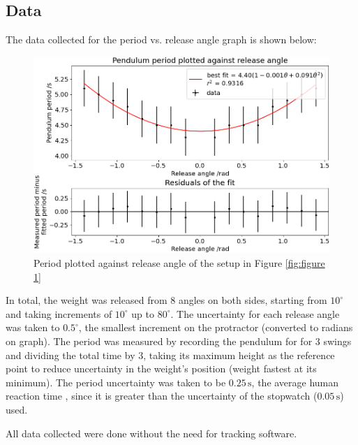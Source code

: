 \documentclass[11pt]{article}
\begin{document}
\begin{multicols}{2}
\subsection{Data} \label{subsec 3.2 Data}
The data collected for the period vs. release angle graph is shown below:

\begin{figure}[H]
    \centering
    \includegraphics[width=\linewidth]{../figures/period_vs_release_angle.png}
    \caption{\centering Period plotted against release angle of the setup in Figure \ref{fig:figure 1}}
    \label{fig:figure 2}
\end{figure}

In total, the weight was released from 8 angles on both sides, starting from $10^\circ$ and taking increments of $10^\circ$ up to $80^\circ$. The uncertainty for each release angle was taken to $0.5^{\circ}$, the smallest increment on the protractor (converted to radians on graph). The period was measured by recording the pendulum for for 3 swings and dividing the total time by 3, taking its maximum height as the reference point to reduce uncertainty in the weight's position (weight fastest at its minimum). The period uncertainty was taken to be $0.25\,\text{s}$, the average human reaction time \cite{reaction-time}, since it is greater than the uncertainty of the stopwatch ($0.05\,\text{s}$) used.

All data collected were done without the need for tracking software.


\end{multicols}
\end{document}
